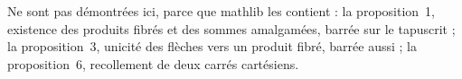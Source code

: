 Ne sont pas démontrées ici, parce que mathlib les contient : la proposition~1, existence des produits fibrés et des sommes amalgamées, barrée sur le tapuscrit ; la proposition~3, unicité des flèches vers un produit fibré, barrée aussi ; la proposition~6, recollement de deux carrés cartésiens.


